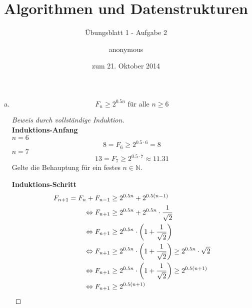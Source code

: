\documentclass[a4paper]{scrartcl}
\title{Algorithmen und Datenstrukturen}
\subtitle{Übungsblatt 1 - Aufgabe 2}
\author{
    anonymous
}
\date{zum 21. Oktober 2014}
\begin{document}
\maketitle

\begin{enumerate}[(a)]
    \item
        \begin{behaupt}
            \begin{equation}
                F_n \geq 2^{\num{0,5}n} \text{ für alle } n \geq 6
            \end{equation}
        \end{behaupt}
        \begin{proof}[Beweis durch vollständige Induktion] \hfill \\
            \textbf{Induktions-Anfang} \\
            $n = 6$ \\
            \begin{equation}
                8 = F_6 \geq 2^{\num{0.5} \cdot 6} = 8
            \end{equation}
            $n = 7$ \\
            \begin{equation}
                13 = F_7 \geq 2^{\num{0.5} \cdot 7} \approx \num{11,31}
            \end{equation}
            Gelte die Behauptung für ein festes $n \in \mathbb{N}$.

            \textbf{Induktions-Schritt} \\
            \begin{equation}
                \begin{split}
                    F_{n+1} = F_{n} + F_{n-1} &\geq 2^{\num{0,5}n} + 2^{\num{0,5}(n-1)} \\
                    \Leftrightarrow F_{n+1} &\geq 2^{\num{0,5}n} + 2^{\num{0,5}n} \cdot \frac{1}{\sqrt{2}} \\
                    \Leftrightarrow F_{n+1} &\geq 2^{\num{0,5}n} \cdot \left( 1 + \frac{1}{\sqrt{2}} \right) \\
                    \Leftrightarrow F_{n+1} &\geq 2^{\num{0,5}n} \cdot \left( 1 + \frac{1}{\sqrt{2}} \right)  \geq 2^{\num{0,5}n} \cdot \sqrt{2} \\
                    \Leftrightarrow F_{n+1} &\geq 2^{\num{0,5}n} \cdot \left( 1 + \frac{1}{\sqrt{2}} \right)  \geq 2^{\num{0,5}(n+1)} \\
                    \Leftrightarrow F_{n+1} &\geq  2^{\num{0,5}(n+1)}
                \end{split}
            \end{equation}
        \end{proof}


\end{enumerate}
\end{document}
